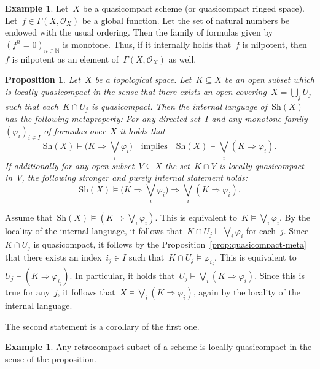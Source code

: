 \documentclass[10pt,reqno,a4paper]{amsbook}
\makeatletter
\theoremstyle{definition}
\newtheorem{ex}[defn]{Example}
\theoremstyle{plain}
\newtheorem{prop}[defn]{Proposition}
\theoremstyle{remark}
\renewcommand{\O}{\mathcal{O}}
\newcommand{\NN}{\mathbb{N}}
\newcommand{\Sh}{\mathrm{Sh}}
\newcommand{\?}{\,{:}\,}
\renewcommand{\_}{\mathpunct{.}\,}
\renewenvironment{proof}[1][\proofname]{\par
  \pushQED{\qed}%
  \normalfont \topsep6\p@\@plus6\p@\relax
  \trivlist
  \item[\hskip\labelsep
        \itshape
    #1\@addpunct{.}]\ignorespaces
}{%
  \popQED\endtrivlist\@endpefalse
}
\makeatother
\begin{document}
\begin{ex}\label{ex:nilpotency-directed}
Let~$X$ be a quasicompact scheme (or quasicompact ringed space).
Let~$f \in \Gamma(X,\O_X)$ be a global function. Let the set of natural
numbers be endowed with the usual ordering. Then the family of formulas given by~$(f^n =
0)_{n \in \NN}$ is monotone. Thus, if it internally holds that~$f$ is
nilpotent, then~$f$ is nilpotent as an element of~$\Gamma(X,\O_X)$ as
well.\end{ex}

\begin{prop}\label{prop:locally-qc}
Let~$X$ be a topological space. Let~$K \subseteq X$ be an open
subset which is \emph{locally quasicompact} in the sense that there exists an open
covering~$X = \bigcup_j U_j$ such that each~$K \cap U_j$ is quasicompact. Then the
internal language of~$\Sh(X)$ has the following metaproperty: For any
directed set~$I$ and any monotone family~$(\varphi_i)_{i \in I}$ of formulas
over~$X$ it holds that
\[ \Sh(X) \models \bigl(K \Rightarrow \bigvee_i \varphi_i\bigr)
  \quad\text{implies}\quad
  \Sh(X) \models \bigvee_i (K \Rightarrow \varphi_i). \]
If additionally for any open subset~$V \subseteq X$ the set~$K \cap V$ is
locally quasicompact in~$V\!$, the following stronger and purely internal
statement holds:
\[ \Sh(X) \models \bigl(K \Rightarrow \bigvee_i \varphi_i\bigr)
  \Longrightarrow
  \bigvee_i (K \Rightarrow \varphi_i). \]
\end{prop}
\begin{proof}Assume that~$\Sh(X) \models (K \Rightarrow \bigvee_i \varphi_i)$.
This is equivalent to~$K \models \bigvee_i \varphi_i$. By the locality of the
internal language, it follows that~$K \cap U_j \models \bigvee_i \varphi_i$ for each~$j$.
Since~$K \cap U_j$ is quasicompact, it follows by the Proposition~\ref{prop:quasicompact-meta} that
there exists an index~$i_j \in I$ such that~$K \cap U_j \models \varphi_{i_j}$.
This is equivalent to~$U_j \models (K \Rightarrow \varphi_{i_j})$. In
particular, it holds that~$U_j \models \bigvee_i (K \Rightarrow \varphi_i)$.
Since this is true for any~$j$, it follows that~$X \models \bigvee_i (K
\Rightarrow \varphi_i)$, again by the locality of the internal language.

The second statement is a corollary of the first one.
\end{proof}

\begin{ex}Any retrocompact subset of a scheme is locally quasicompact in the
sense of the proposition.\end{ex}
\end{document}
